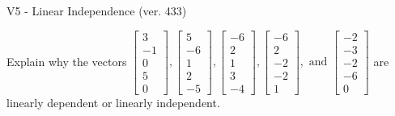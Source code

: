 \begin{exercise}
  \begin{exerciseTitle}V5 - Linear Independence (ver. 433)\end{exerciseTitle}
  \begin{exerciseStatement}
    Explain why the vectors \(\left[\begin{array}{r}
3 \\
-1 \\
0 \\
5 \\
0
\end{array}\right] , \left[\begin{array}{r}
5 \\
-6 \\
1 \\
2 \\
-5
\end{array}\right] , \left[\begin{array}{r}
-6 \\
2 \\
1 \\
3 \\
-4
\end{array}\right] , \left[\begin{array}{r}
-6 \\
2 \\
-2 \\
-2 \\
1
\end{array}\right] , \text{ and } \left[\begin{array}{r}
-2 \\
-3 \\
-2 \\
-6 \\
0
\end{array}\right]\) are linearly dependent or linearly independent.	



\end{exerciseStatement}
\end{exercise}
